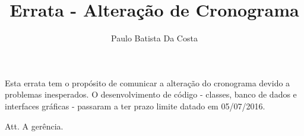\documentclass[12pt,a4paper,final]{report}
\author{Paulo Batista Da Costa}
\title{Errata - Alteração de Cronograma}
\begin{document}
\maketitle

Esta errata tem o propósito de comunicar a alteração do cronograma devido a problemas inesperados. 
O desenvolvimento de código - classes, banco de dados e interfaces gráficas - passaram a ter prazo limite datado em 05/07/2016.

Att. A gerência.
\end{document}

